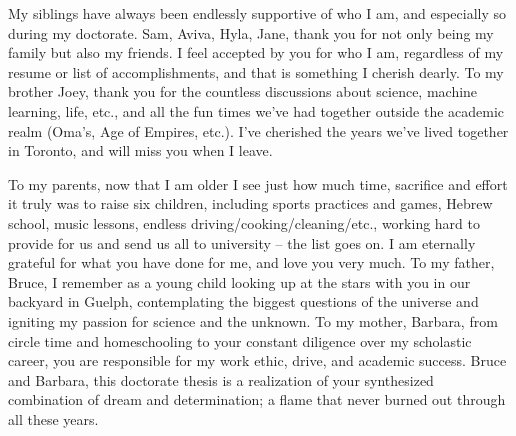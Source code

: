 \documentclass[letterpaper]{ut-thesis} %
\begin{document}
\begin{preliminary}
\begin{acknowledgements}
My siblings have always been endlessly supportive of who I am, and especially so during my doctorate.
Sam, Aviva, Hyla, Jane, thank you for not only being my family but also my friends.
I feel accepted by you for who I am, regardless of my resume or list of accomplishments, and that is something I cherish dearly.  
To my brother Joey, thank you for the countless discussions about science, machine learning, life, etc., and all the fun times we've had together outside the academic realm (Oma's, Age of Empires, etc.). 
I've cherished the years we've lived together in Toronto, and will miss you when I leave. 

To my parents, now that I am older I see just how much time, sacrifice and effort it truly was to raise six children, including sports practices and games, Hebrew school, music lessons, endless driving/cooking/cleaning/etc., working hard to provide for us and send us all to university -- the list goes on. 
I am eternally grateful for what you have done for me, and love you very much. 
To my father, Bruce, I remember as a young child looking up at the stars with you in our backyard in Guelph, contemplating the biggest questions of the universe and igniting my passion for science and the unknown.
To my mother, Barbara, from circle time and homeschooling to your constant diligence over my scholastic career, you are responsible for my work ethic, drive, and academic success.
Bruce and Barbara, this doctorate thesis is a realization of your synthesized combination of dream and determination; a flame that never burned out through all these years. 

\end{acknowledgements}

\tableofcontents

\listoftables

\listoffigures

\end{preliminary}

\end{document}
